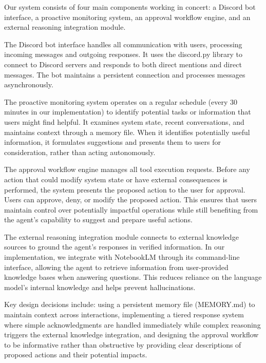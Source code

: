 Our system consists of four main components working in concert: a Discord bot interface, a proactive monitoring system, an approval workflow engine, and an external reasoning integration module.

The Discord bot interface handles all communication with users, processing incoming messages and outgoing responses. It uses the discord.py library to connect to Discord servers and responds to both direct mentions and direct messages. The bot maintains a persistent connection and processes messages asynchronously.

The proactive monitoring system operates on a regular schedule (every 30 minutes in our implementation) to identify potential tasks or information that users might find helpful. It examines system state, recent conversations, and maintains context through a memory file. When it identifies potentially useful information, it formulates suggestions and presents them to users for consideration, rather than acting autonomously.

The approval workflow engine manages all tool execution requests. Before any action that could modify system state or have external consequences is performed, the system presents the proposed action to the user for approval. Users can approve, deny, or modify the proposed action. This ensures that users maintain control over potentially impactful operations while still benefiting from the agent's capability to suggest and prepare useful actions.

The external reasoning integration module connects to external knowledge sources to ground the agent's responses in verified information. In our implementation, we integrate with NotebookLM through its command-line interface, allowing the agent to retrieve information from user-provided knowledge bases when answering questions. This reduces reliance on the language model's internal knowledge and helps prevent hallucinations.

Key design decisions include: using a persistent memory file (MEMORY.md) to maintain context across interactions, implementing a tiered response system where simple acknowledgments are handled immediately while complex reasoning triggers the external knowledge integration, and designing the approval workflow to be informative rather than obstructive by providing clear descriptions of proposed actions and their potential impacts.